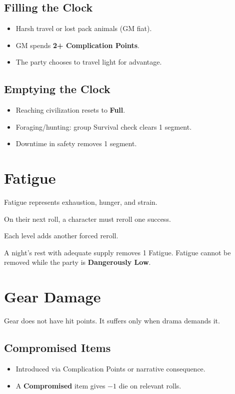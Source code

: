 \documentclass[12pt]{book}
\begin{document}
\subsection*{Filling the Clock}
\begin{itemize}
  \item Harsh travel or lost pack animals (GM fiat).
  \item GM spends \textbf{2+ Complication Points}.
  \item The party chooses to travel light for advantage.
\end{itemize}

\subsection*{Emptying the Clock}
\begin{itemize}
  \item Reaching civilization resets to \textbf{Full}.
  \item Foraging/hunting: group Survival check clears 1 segment.
  \item Downtime in safety removes 1 segment.
\end{itemize}

\section{Fatigue}
Fatigue represents exhaustion, hunger, and strain.

\begin{description}[leftmargin=2cm]
  \item[Effect:] On their next roll, a character must reroll one success.
  \item[Stacking:] Each level adds another forced reroll.
  \item[Recovery:] A night’s rest with adequate supply removes 1 Fatigue.
    Fatigue cannot be removed while the party is \textbf{Dangerously Low}.
\end{description}

\section{Gear Damage}
Gear does not have hit points. It suffers only when drama demands it.

\subsection*{Compromised Items}
\begin{itemize}
  \item Introduced via Complication Points or narrative consequence.
  \item A \textbf{Compromised} item gives \(-1\) die on relevant rolls.
\end{itemize}
\end{document}
